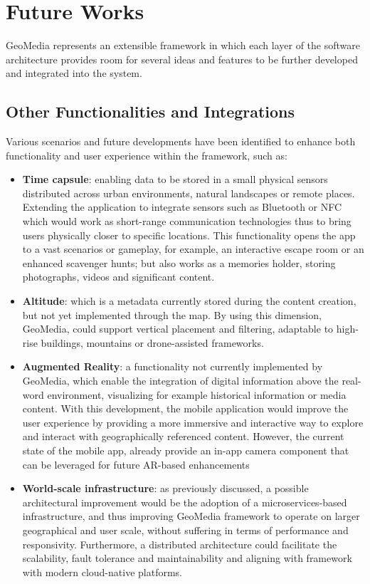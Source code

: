 \chapter{Future Works}
\label{cap:future_works}

GeoMedia represents an extensible framework in which each layer of the software architecture provides room for several ideas and features to be further developed and integrated into the system.

\section{Other Functionalities and Integrations}

Various scenarios and future developments have been identified to enhance both functionality and user experience within the framework, such as:

\begin{itemize}
    \item \textbf{Time capsule}: enabling data to be stored in a small physical sensors distributed across urban environments, natural landscapes or remote places. Extending the application to integrate sensors such as Bluetooth or NFC which would work as short-range communication technologies thus to bring users physically closer to specific locations. This functionality opens the app to a vast scenarios or gameplay, for example, an interactive escape room or an enhanced scavenger hunts; but also works as a memories holder, storing photographs, videos and significant content.
    \item \textbf{Altitude}: which is a metadata currently stored during the content creation, but not yet implemented through the map. By using this dimension, GeoMedia, could support vertical placement and filtering, adaptable to high-rise buildings, mountains or drone-assisted frameworks.
    \item \textbf{Augmented Reality}: a functionality not currently implemented by GeoMedia, which enable the integration of digital information above the real-word environment, visualizing for example historical information or media content. With this development, the mobile application would improve the user experience by providing a more immersive and interactive way to explore and interact with geographically referenced content. However, the current state of the mobile app, already provide an in-app camera component that can be leveraged for future AR-based enhancements
    \item \textbf{World-scale infrastructure}: as previously discussed, a possible architectural improvement would be the adoption of a microservices-based infrastructure, and thus improving GeoMedia framework to operate on larger geographical and user scale, without suffering in terms of performance and responsivity. Furthermore, a distributed architecture could facilitate the scalability, fault tolerance and maintainability and aligning with framework with modern cloud-native platforms.
\end{itemize}


